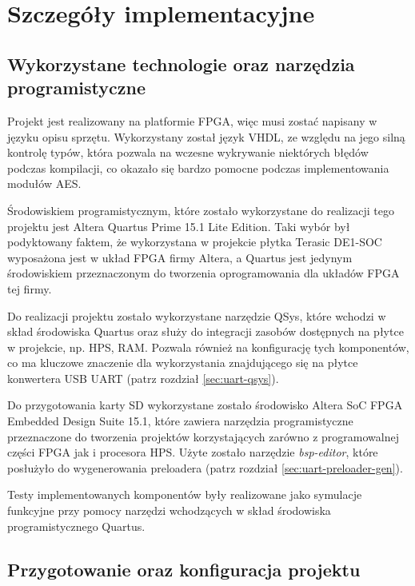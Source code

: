 \section{Szczegóły implementacyjne}
\label{sec:szczegoly-implementacyjne}

\subsection{Wykorzystane technologie oraz narzędzia programistyczne}
Projekt jest realizowany na platformie FPGA, więc musi zostać napisany w języku opisu sprzętu. Wykorzystany został język VHDL, ze względu na jego silną kontrolę typów, która pozwala na wczesne wykrywanie niektórych błędów podczas kompilacji, co okazało się bardzo pomocne podczas implementowania modułów AES.

Środowiskiem programistycznym, które zostało wykorzystane do realizacji tego projektu jest Altera Quartus Prime 15.1 Lite Edition. Taki wybór był podyktowany faktem, że wykorzystana w projekcie płytka Terasic DE1-SOC wyposażona jest w układ FPGA firmy Altera, a Quartus jest jedynym środowiskiem przeznaczonym do tworzenia oprogramowania dla układów FPGA tej firmy.

Do realizacji projektu zostało wykorzystane narzędzie QSys, które wchodzi w skład środowiska Quartus oraz służy do integracji zasobów dostępnych na płytce w projekcie, np. HPS, RAM. Pozwala również na konfigurację tych komponentów, co ma kluczowe znaczenie dla wykorzystania znajdującego się na płytce konwertera USB UART (patrz rozdział \ref{sec:uart-qsys}).

Do przygotowania karty SD wykorzystane zostało środowisko Altera SoC FPGA Embedded Design Suite 15.1, które zawiera narzędzia programistyczne przeznaczone do tworzenia projektów korzystających zarówno z programowalnej części FPGA jak i procesora HPS. Użyte zostało narzędzie \textit{bsp-editor}, które posłużyło do wygenerowania preloadera (patrz rozdział \ref{sec:uart-preloader-gen}).

Testy implementowanych komponentów były realizowane jako symulacje funkcyjne przy pomocy narzędzi wchodzących w skład środowiska programistycznego Quartus.


\subsection{Przygotowanie oraz konfiguracja projektu}
\label{sec:przygotowanie-projektu}

